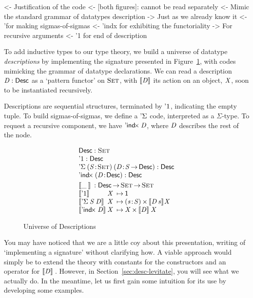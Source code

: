 \begin{wstructure}
<- Justification of the code 
    <- [both figures]: cannot be read separately
    <- Mimic the standard grammar of datatypes description
        -> Just as we already know it
        <- '\Sigma for making sigmas-of-sigmas
        <- 'indx for exhibiting the functoriality
            -> For recursive arguments
        <- '1 for end of description
\end{wstructure}

To add inductive types to our type theory, we build a universe of
datatype \emph{descriptions} by implementing the signature presented
in Figure~\ref{fig:desc_universe}, with codes mimicking the grammar of
datatype declarations. We can read a description $\V{D}:\Desc$ as a
`pattern functor' on $\Set$, with $\SYMBdescop{\V{D}}$ its action on
an object, \(\V{X}\), soon to be instantiated recursively.

Descriptions are sequential structures, terminated by $\DUnit$, indicating
the empty tuple. To build
sigmas-of-sigmas, we define a $\SYMBDSigma$ code, interpreted as a
$\Sigma$-type. To request a recursive component, we have $\DIndx{\V{D}}$,
where \(\V{D}\) describes the rest of the node.

\begin{figure}
\[\stk{
\begin{array}{l}
\Desc : \Set\\
\DUnit : \Desc\\
\DSigma{(\Bhab{\V{S}}{\Set})}{(\Bhab{\V{D}}{\V{S} \To \Desc})} : \Desc\\
\DIndx{(\Bhab{\V{D}}{\Desc})} : \Desc \\
\end{array}
\smallskip\\
\begin{array}{l@{\V{X}\:\mapsto\:}l}     
\multicolumn{2}{l}{\descop{\_\:}{} : \Desc \To \Set \To \Set} \\
 \descop{\DUnit}{} &  \Unit \\
 \descop{\DSigma{\V{S}}{\V{D}}}{} &
     \SIGMAS{\Bhab{\V{s}}{\V{S}}}{\descop{\V{D}\,\V{s}}{\!\V{X}}}  \\
\descop{\DIndx{\V{D}}}{}  &  \TIMES{\V{X}}{\descop{\V{D}}{\V{X}}}
\end{array}
}\]

\caption{Universe of Descriptions}
\label{fig:desc_universe}
 
\end{figure}

You may have noticed that we are a little coy about this presentation,
writing of `implementing a signature' without clarifying how. A viable
approach would simply be to extend the theory with constants for the
constructors and an operator for \(\descop{\V{D}}\). However, in
Section~\ref{sec:desc-levitate}, you will see what we actually do.  In
the meantime, let us first gain some intuition for its use by
developing some examples.


